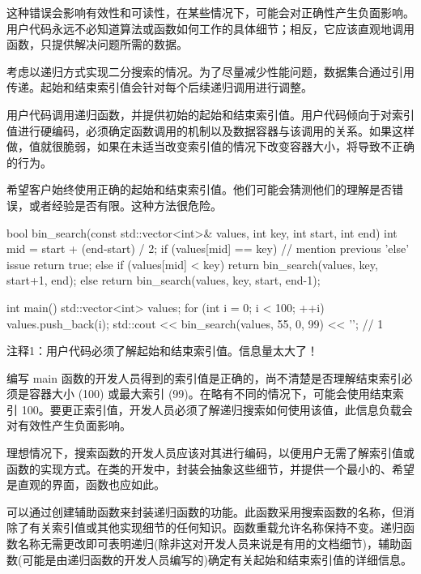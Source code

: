 这种错误会影响有效性和可读性，在某些情况下，可能会对正确性产生负面影响。用户代码永远不必知道算法或函数如何工作的具体细节；相反，它应该直观地调用函数，只提供解决问题所需的数据。


考虑以递归方式实现二分搜索的情况。为了尽量减少性能问题，数据集合通过引用传递。起始和结束索引值会针对每个后续递归调用进行调整。

用户代码调用递归函数，并提供初始的起始和结束索引值。用户代码倾向于对索引值进行硬编码，必须确定函数调用的机制以及数据容器与该调用的关系。如果这样做，值就很脆弱，如果在未适当改变索引值的情况下改变容器大小，将导致不正确的行为。

希望客户始终使用正确的起始和结束索引值。他们可能会猜测他们的理解是否错误，或者经验是否有限。这种方法很危险。


\begin{cpp}
bool bin_search(const std::vector<int>& values, int key, int start, int end)
{
  int mid = start + (end-start) / 2;
  if (values[mid] == key) // mention previous 'else' issue
    return true;
  else if (values[mid] < key)
    return bin_search(values, key, start+1, end);
  else
    return bin_search(values, key, start, end-1);
}

int main() {
  std::vector<int> values;
  for (int i = 0; i < 100; ++i)
    values.push_back(i);
  std::cout << bin_search(values, 55, 0, 99) << '\n'; // 1
}
\end{cpp}

{\footnotesize
注释1：用户代码必须了解起始和结束索引值。信息量太大了！
}


编写 main 函数的开发人员得到的索引值是正确的，尚不清楚是否理解结束索引必须是容器大小 (100) 或最大索引 (99)。在略有不同的情况下，可能会使用结束索引 100。要更正索引值，开发人员必须了解递归搜索如何使用该值，此信息负载会对有效性产生负面影响。

理想情况下，搜索函数的开发人员应该对其进行编码，以便用户无需了解索引值或函数的实现方式。在类的开发中，封装会抽象这些细节，并提供一个最小的、希望是直观的界面，函数也应如此。


可以通过创建辅助函数来封装递归函数的功能。此函数采用搜索函数的名称，但消除了有关索引值或其他实现细节的任何知识。函数重载允许名称保持不变。递归函数名称无需更改即可表明递归(除非这对开发人员来说是有用的文档细节)，辅助函数(可能是由递归函数的开发人员编写的)确定有关起始和结束索引值的详细信息。

